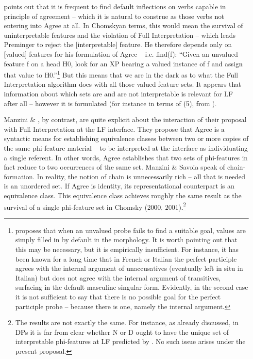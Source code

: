 \documentclass[output=paper]{langsci/langscibook}
\begin{document}
\citet{Preminger2014}{} points out that it is frequent to find default inflections on verbs capable in principle of agreement – which it is natural to construe as those verbs not entering into Agree at all.{} In Chomskyan terms, this would mean the survival of uninterpretable features and the violation of Full Interpretation – which leads Preminger to reject the [interpretable] feature. He therefore {depends only on [valued] features for his formulation of Agree – i.e.} {fi}{nd(f): “Given an unvalued feature f on a head H0, look for an XP bearing a valued instance of f and assign that value to H0.”}\footnote{\citet{Preminger2014} proposes that when an unvalued probe fails to find a suitable goal, values are simply filled in by default in the morphology. It is worth pointing out that this may be necessary, but it is empirically insufficient. For instance, it has been known for a long time \citep{Kayne1989} that in French or Italian the perfect participle agrees with the internal argument of unaccusatives (eventually left in situ in Italian) but does not agree with the internal argument of transitives, surfacing in the default masculine singular form. Evidently, in the second case it is not sufficient to say that there is no possible goal for the perfect participle probe – because there is one, namely the internal argument.} { But this means that we are in the dark as to what the Full Interpretation algorithm does with all those valued feature sets. It appears that information about which sets are and are not interpretable is relevant for LF after all – however it is formulated (for instance in terms of (5), from \citealt{Baker2008}).}

   Manzini \& \citet{Savoia2007}, by contrast, are quite explicit about the interaction of their proposal with Full Interpretation at the LF interface. They propose that Agree is a syntactic means for establishing equivalence classes between two or more copies of the same phi-feature material – to be interpreted at the interface as individuating a single referent. In other words, Agree establishes that two sets of phi-features in fact reduce to two occurrences of the same set. Manzini \& Savoia speak of chain-formation. In reality, the notion of chain is unnecessarily rich – all that is needed is an unordered set. If Agree is identity, its representational counterpart is an equivalence class. This equivalence class achieves roughly the same result as the survival of a single phi-feature set in Chomsky (2000, 2001).\footnote{The results are not exactly the same. For instance, {as already discussed, in DPs it is far from clear whether N or D ought to have the unique set of interpretable phi-featu}{r}{es at LF}{ predicted by \citet{Chomsky2001}. No such issue arises under the present proposal.}}
\end{document}

